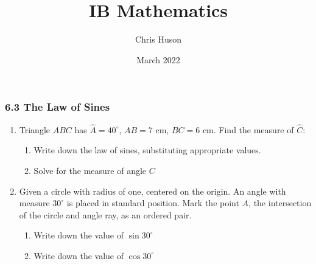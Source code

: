 \documentclass[12pt, twoside]{article}
\title{IB Mathematics}
\author{Chris Huson}
\date{March 2022}
\begin{document}
\subsubsection*{6.3 The Law of Sines}
\begin{enumerate}
    \item Triangle $ABC$ has $\hat{A}=40^\circ$, $AB=7 \text{ cm}$, $BC=6 \text{ cm}$. Find the measure of $\hat{C}$:
    \begin{enumerate}
          \item Write down the law of sines, substituting appropriate values.\\[0.5in]
          \item Solve for the measure of angle $C$
    \end{enumerate}
    \begin{center}
    \end{center}

\newpage
\item Given a circle with radius of one, centered on the origin. An angle with measure $30^\circ$ is placed in standard position. Mark the point $A$, the intersection of the circle and angle ray, as an ordered pair.
    \begin{center}
    \end{center}
    \begin{enumerate}
          \item Write down the value of $\sin{30^\circ}$\\[0.25in]
          \item  Write down the value of $\cos{30^\circ}$\\[0.25in]
    \end{enumerate}
    
    
    

\end{enumerate}
\end{document}
